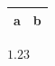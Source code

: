 \documentclass{article}
\begin{document}
\begin{tabular}{ll}\toprule a & b \\\bottomrule\end{tabular}
$\num{1.23}$
\end{document}
